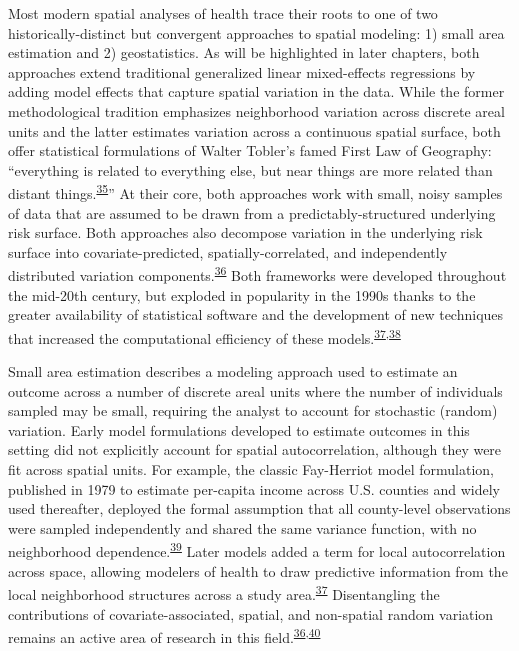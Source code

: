 \documentclass[
]{article}
\begin{document}
Most modern spatial analyses of health trace their roots to one of two historically-distinct but convergent approaches to spatial modeling: 1) small area estimation and 2) geostatistics. As will be highlighted in later chapters, both approaches extend traditional generalized linear mixed-effects regressions by adding model effects that capture spatial variation in the data. While the former methodological tradition emphasizes neighborhood variation across discrete areal units and the latter estimates variation across a continuous spatial surface, both offer statistical formulations of Walter Tobler's famed First Law of Geography: ``everything is related to everything else, but near things are more related than distant things.\textsuperscript{\protect\hyperlink{ref-Tobler1970}{35}}'' At their core, both approaches work with small, noisy samples of data that are assumed to be drawn from a predictably-structured underlying risk surface. Both approaches also decompose variation in the underlying risk surface into covariate-predicted, spatially-correlated, and independently distributed variation components.\textsuperscript{\protect\hyperlink{ref-Riebler2016}{36}} Both frameworks were developed throughout the mid-20th century, but exploded in popularity in the 1990s thanks to the greater availability of statistical software and the development of new techniques that increased the computational efficiency of these models.\textsuperscript{\protect\hyperlink{ref-Besag1991}{37},\protect\hyperlink{ref-Lindgren2011}{38}}

Small area estimation describes a modeling approach used to estimate an outcome across a number of discrete areal units where the number of individuals sampled may be small, requiring the analyst to account for stochastic (random) variation. Early model formulations developed to estimate outcomes in this setting did not explicitly account for spatial autocorrelation, although they were fit across spatial units. For example, the classic Fay-Herriot model formulation, published in 1979 to estimate per-capita income across U.S. counties and widely used thereafter, deployed the formal assumption that all county-level observations were sampled independently and shared the same variance function, with no neighborhood dependence.\textsuperscript{\protect\hyperlink{ref-III1979a}{39}} Later models added a term for local autocorrelation across space, allowing modelers of health to draw predictive information from the local neighborhood structures across a study area.\textsuperscript{\protect\hyperlink{ref-Besag1991}{37}} Disentangling the contributions of covariate-associated, spatial, and non-spatial random variation remains an active area of research in this field.\textsuperscript{\protect\hyperlink{ref-Riebler2016}{36},\protect\hyperlink{ref-MacNab2011}{40}}
\end{document}
